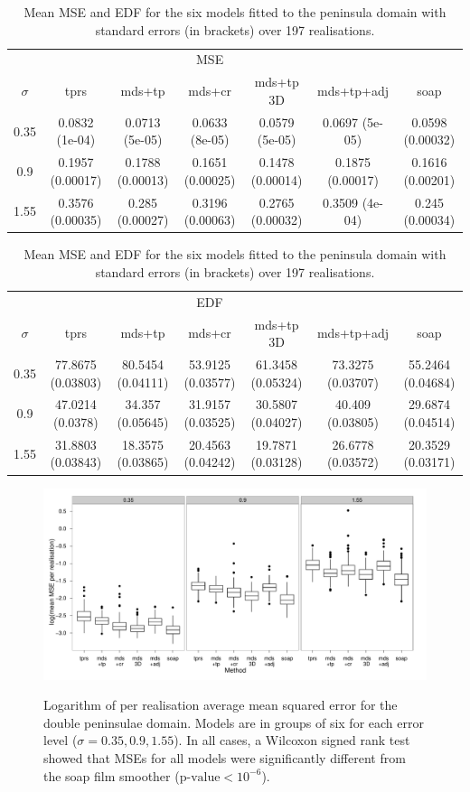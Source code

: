 {\begin{table}
\centering
\begin{tabular}{c c c c c c c}
 & &  & MSE  & & &\\ 
$\sigma$  & tprs & mds+tp & mds+cr & mds+tp 3D & mds+tp+adj & soap\\ 
\hline
0.35  & 0.0832 (1e-04) & 0.0713 (5e-05) & 0.0633 (8e-05) & 0.0579 (5e-05) & 0.0697 (5e-05) & 0.0598 (0.00032) \\ 
0.9  & 0.1957 (0.00017) & 0.1788 (0.00013) & 0.1651 (0.00025) & 0.1478 (0.00014) & 0.1875 (0.00017) & 0.1616 (0.00201) \\ 
1.55  & 0.3576 (0.00035) & 0.285 (0.00027) & 0.3196 (0.00063) & 0.2765 (0.00032) & 0.3509 (4e-04) & 0.245 (0.00034) \\
\end{tabular}
\begin{tabular}{c c c c c c c}
 & &  & EDF  & & &\\ 
$\sigma$  & tprs & mds+tp & mds+cr & mds+tp 3D & mds+tp+adj & soap\\ 
\hline
0.35  & 77.8675 (0.03803) & 80.5454 (0.04111) & 53.9125 (0.03577) & 61.3458 (0.05324) & 73.3275 (0.03707) & 55.2464 (0.04684)\\ 
0.9  & 47.0214 (0.0378) & 34.357 (0.05645) & 31.9157 (0.03525) & 30.5807 (0.04027) & 40.409 (0.03805) & 29.6874 (0.04514) \\
1.55  & 31.8803 (0.03843) & 18.3575 (0.03865) & 20.4563 (0.04242) & 19.7871 (0.03128) & 26.6778 (0.03572) & 20.3529 (0.03171)\\ 
\end{tabular}
\caption{Mean MSE and EDF for the six models fitted to the peninsula domain with standard errors (in brackets) over 197 realisations.}
\label{bigwt2resultstable}
\end{table}

\begin{figure}
\centering
\includegraphics[width=9.5in]{mds/figs/big-mds-wt2-boxplot.pdf} \\
\caption{Logarithm of per realisation average mean squared error for the double peninsulae domain. Models are in groups of six for each error level ($\sigma=0.35,0.9,1.55$). In all cases, a Wilcoxon signed rank test showed that MSEs for all models were significantly different from the soap film smoother ($\text{p-value} < 10^{-6}$).}
\label{big-wt2-mses}
\end{figure}


}
